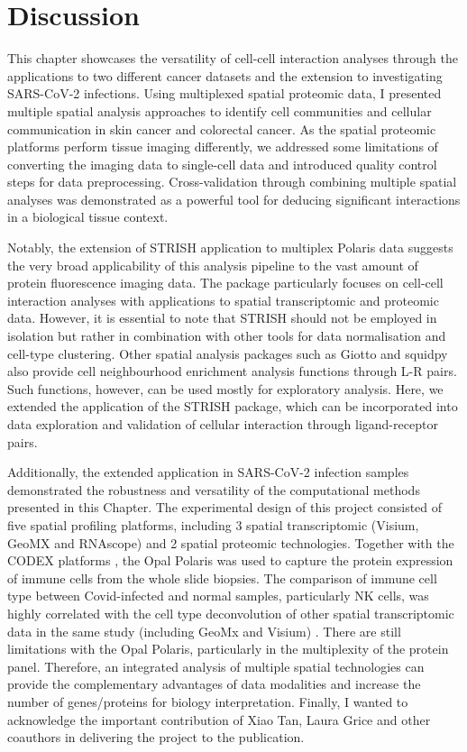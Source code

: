 \section{Discussion}
This chapter showcases the versatility of cell-cell interaction analyses through the applications to two different cancer datasets and the extension to investigating SARS-CoV-2 infections. Using multiplexed spatial proteomic data, I presented multiple spatial analysis approaches to identify cell communities and cellular communication in skin cancer and colorectal cancer. As the spatial proteomic platforms perform tissue imaging differently, we addressed some limitations of converting the imaging data to single-cell data and introduced quality control steps for data preprocessing. Cross-validation through combining multiple spatial analyses was demonstrated as a powerful tool for deducing significant interactions in a biological tissue context.   

Notably, the extension of STRISH application to multiplex Polaris data suggests the very broad applicability of this analysis pipeline to the vast amount of protein fluorescence imaging data. The package particularly focuses on cell-cell interaction analyses with applications to spatial transcriptomic and proteomic data. However, it is essential to note that STRISH should not be employed in isolation but rather in combination with other tools for data normalisation and cell-type clustering. Other spatial analysis packages such as Giotto \cite{dries2021giotto} and squidpy \cite{palla2022squidpy} also provide cell neighbourhood enrichment analysis functions through L-R pairs. Such functions, however, can be used mostly for exploratory analysis. Here, we extended the application of the STRISH package, which can be incorporated into data exploration and validation of cellular interaction through ligand-receptor pairs. 

Additionally, the extended application in SARS-CoV-2 infection samples demonstrated the robustness and versatility of the computational methods presented in this Chapter. The experimental design of this project consisted of five spatial profiling platforms, including 3 spatial transcriptomic (Visium, GeoMX and RNAscope) and 2 spatial proteomic technologies. Together with the CODEX platforms \cite{goltsev2018CODEX}, the Opal Polaris was used to capture the protein expression of immune cells from the whole slide biopsies. The comparison of immune cell type between Covid-infected and normal samples, particularly NK cells, was highly correlated with the cell type deconvolution of other spatial transcriptomic data in the same study (including GeoMx and Visium) \cite{Tan2023multiomics}. There are still limitations with the Opal Polaris, particularly in the multiplexity of the protein panel. Therefore, an integrated analysis of multiple spatial technologies can provide the complementary advantages of data modalities and increase the number of genes/proteins for biology interpretation. Finally, I wanted to acknowledge the important contribution of Xiao Tan, Laura Grice and other coauthors in delivering the project to the publication.   

